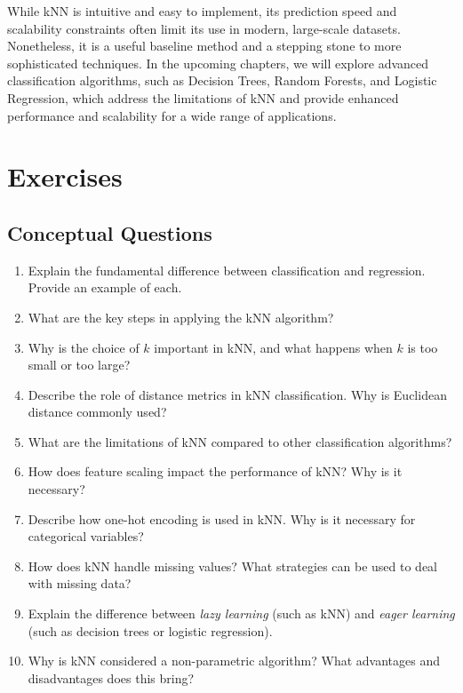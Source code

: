 \documentclass[
  11pt,
]{book}
\providecommand{\tightlist}{%
  \setlength{\itemsep}{0pt}\setlength{\parskip}{0pt}}
\theoremstyle{definition}
\theoremstyle{definition}
\theoremstyle{definition}
\theoremstyle{definition}
\theoremstyle{remark}
\begin{document}
While kNN is intuitive and easy to implement, its prediction speed and scalability constraints often limit its use in modern, large-scale datasets. Nonetheless, it is a useful baseline method and a stepping stone to more sophisticated techniques. In the upcoming chapters, we will explore advanced classification algorithms, such as Decision Trees, Random Forests, and Logistic Regression, which address the limitations of kNN and provide enhanced performance and scalability for a wide range of applications.

\section{Exercises}\label{exercises-5}

\subsection*{Conceptual Questions}\label{conceptual-questions-3}


\begin{enumerate}
\def\labelenumi{\arabic{enumi}.}
\tightlist
\item
  Explain the fundamental difference between classification and regression. Provide an example of each.\\
\item
  What are the key steps in applying the kNN algorithm?\\
\item
  Why is the choice of \(k\) important in kNN, and what happens when \(k\) is too small or too large?\\
\item
  Describe the role of distance metrics in kNN classification. Why is Euclidean distance commonly used?\\
\item
  What are the limitations of kNN compared to other classification algorithms?\\
\item
  How does feature scaling impact the performance of kNN? Why is it necessary?\\
\item
  Describe how one-hot encoding is used in kNN. Why is it necessary for categorical variables?\\
\item
  How does kNN handle missing values? What strategies can be used to deal with missing data?\\
\item
  Explain the difference between \emph{lazy learning} (such as kNN) and \emph{eager learning} (such as decision trees or logistic regression).\\
\item
  Why is kNN considered a non-parametric algorithm? What advantages and disadvantages does this bring?
\end{enumerate}
\end{document}
